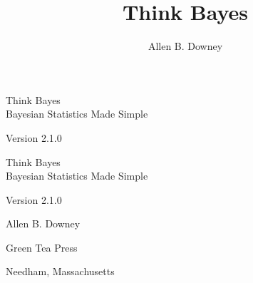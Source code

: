 \documentclass[12pt]{book}
\title{Think Bayes}
\author{Allen B. Downey}
\newcommand{\thetitle}{Think Bayes}
\newcommand{\thesubtitle}{Bayesian Statistics Made Simple}
\newcommand{\theauthor}{Allen B. Downey}
\newcommand{\theversion}{Version 2.1.0}
\theoremstyle{exercise}
\newif\ifplastex
\begin{document}
\frontmatter

\ifplastex

\maketitle

\else

\begin{latexonly}

\thispagestyle{empty}

\begin{flushright}
\vspace*{2.0in}

\begin{spacing}{3}
{\huge \thetitle} \\
{\Large \thesubtitle}
\end{spacing}

\vspace{0.25in}

\theversion

\vfill
\end{flushright}

\newpage
\thispagestyle{empty}

\quad

\newpage
\thispagestyle{empty}

\begin{flushright}
\vspace*{2.0in}

\begin{spacing}{3}
{\huge \thetitle} \\
{\Large \thesubtitle}
\end{spacing}

\vspace{0.25in}

\theversion

\vspace{1in}

{\Large \theauthor}

\vspace{0.5in}

{\Large Green Tea Press}

{\small Needham, Massachusetts}

\vfill
\end{flushright}


\end{latexonly}
\end{document}

